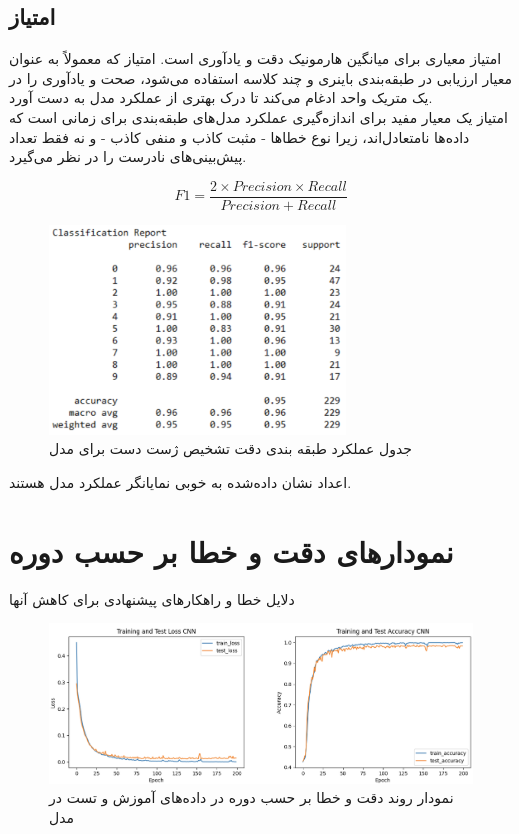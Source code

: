 \subsection{امتیاز }
امتیاز  معیاری برای میانگین هارمونیک دقت و یادآوری است. امتیاز  که معمولاً به عنوان معیار ارزیابی در طبقه‌بندی باینری و چند کلاسه استفاده می‌شود، صحت و یادآوری را در یک متریک واحد ادغام می‌کند تا درک بهتری از عملکرد مدل به دست آورد.
\\
امتیاز  یک معیار مفید برای اندازه‌گیری عملکرد مدل‌های طبقه‌بندی برای زمانی است که داده‌ها نامتعادل‌اند، زیرا نوع خطاها - مثبت کاذب و منفی کاذب - و نه فقط تعداد پیش‌بینی‌های نادرست را در نظر می‌گیرد.


\[ F1  = \frac{2 \times Precision \times Recall}{Precision + Recall} \]


\begin{figure}[h]
    \centering
    \includegraphics[width=0.7\textwidth]{textchart.png}
    \caption{جدول عملکرد طبقه بندی دقت تشخیص ژست دست برای مدل }
\end{figure}


اعداد نشان داده‌شده به خوبی نمایانگر عملکرد مدل هستند. 


\section{نمودار‌های دقت و خطا بر حسب دوره}
دلایل خطا و راهکارهای پیشنهادی برای کاهش آنها






\begin{figure}[h]
    \centering
    \includegraphics[width=1\textwidth]{CNN.png}
    \caption{نمودار روند دقت و خطا بر حسب دوره در داده‌های آموزش و تست در مدل }
\end{figure}




